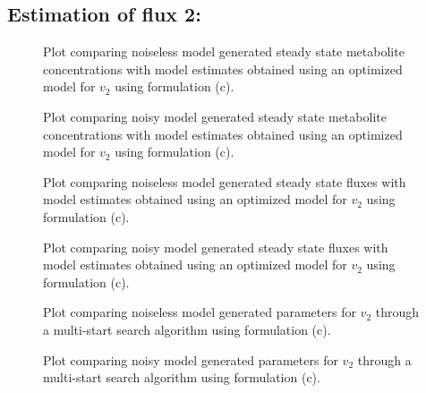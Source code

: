 \documentclass[10pt]{report}
\begin{document}
	\subsection{Estimation of flux 2:}
	\begin{figure}[!tbhp]
		\caption{Plot comparing noiseless model generated steady state metabolite concentrations with model estimates obtained using an optimized model for $v_2$ using formulation (c). }
	\end{figure}
	\begin{figure}[!tbhp]
		\caption{Plot comparing noisy model generated steady state metabolite concentrations with model estimates obtained using an optimized model for $v_2$ using formulation (c). }
	\end{figure}
	\begin{figure}[!tbhp]
		\caption{Plot comparing noiseless model generated steady state fluxes with model estimates obtained using an optimized model for $v_2$ using formulation (c). }
	\end{figure}
	\begin{figure}[!tbhp]
		\caption{Plot comparing noisy model generated steady state fluxes with model estimates obtained using an optimized model for $v_2$ using formulation (c). }
	\end{figure}
	\begin{figure}[!tbhp]
		\caption{Plot comparing noiseless model generated parameters for $v_2$ through a multi-start search algorithm using formulation (c). }
	\end{figure}
	\begin{figure}[!tbhp]
		\caption{Plot comparing noisy model generated parameters for $v_2$ through a multi-start search algorithm using formulation (c). }
	\end{figure}
	\clearpage
	
\end{document}
